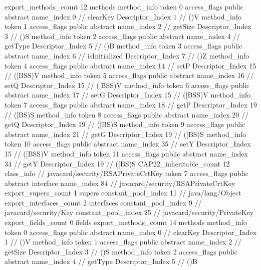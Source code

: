 {{{{			}
			export_methods_count	12
			methods {
				method_info {
					token	0
					access_flags	public abstract
					name_index	0		// clearKey
					Descriptor_Index	1		// ()V
				}
				method_info {
					token	1
					access_flags	public abstract
					name_index	2		// getSize
					Descriptor_Index	3		// ()S
				}
				method_info {
					token	2
					access_flags	public abstract
					name_index	4		// getType
					Descriptor_Index	5		// ()B
				}
				method_info {
					token	3
					access_flags	public abstract
					name_index	6		// isInitialized
					Descriptor_Index	7		// ()Z
				}
				method_info {
					token	4
					access_flags	public abstract
					name_index	14		// setP
					Descriptor_Index	15		// ([BSS)V
				}
				method_info {
					token	5
					access_flags	public abstract
					name_index	16		// setQ
					Descriptor_Index	15		// ([BSS)V
				}
				method_info {
					token	6
					access_flags	public abstract
					name_index	17		// setG
					Descriptor_Index	15		// ([BSS)V
				}
				method_info {
					token	7
					access_flags	public abstract
					name_index	18		// getP
					Descriptor_Index	19		// ([BS)S
				}
				method_info {
					token	8
					access_flags	public abstract
					name_index	20		// getQ
					Descriptor_Index	19		// ([BS)S
				}
				method_info {
					token	9
					access_flags	public abstract
					name_index	21		// getG
					Descriptor_Index	19		// ([BS)S
				}
				method_info {
					token	10
					access_flags	public abstract
					name_index	35		// setY
					Descriptor_Index	15		// ([BSS)V
				}
				method_info {
					token	11
					access_flags	public abstract
					name_index	34		// getY
					Descriptor_Index	19		// ([BS)S
				}
			}
			CAP22_inheritable_count	12
		}
		class_info {		// javacard/security/RSAPrivateCrtKey
			token	7
			access_flags	public abstract interface
			name_index	84		// javacard/security/RSAPrivateCrtKey
			export_supers_count	1
			supers {
				constant_pool_index	11		// java/lang/Object
			}
			export_interfaces_count	2
			interfaces {
				constant_pool_index	9		// javacard/security/Key
				constant_pool_index	25		// javacard/security/PrivateKey
			}
			export_fields_count	0
			fields {
			}
			export_methods_count	14
			methods {
				method_info {
					token	0
					access_flags	public abstract
					name_index	0		// clearKey
					Descriptor_Index	1		// ()V
				}
				method_info {
					token	1
					access_flags	public abstract
					name_index	2		// getSize
					Descriptor_Index	3		// ()S
				}
				method_info {
					token	2
					access_flags	public abstract
					name_index	4		// getType
					Descriptor_Index	5		// ()B
}}}}}
